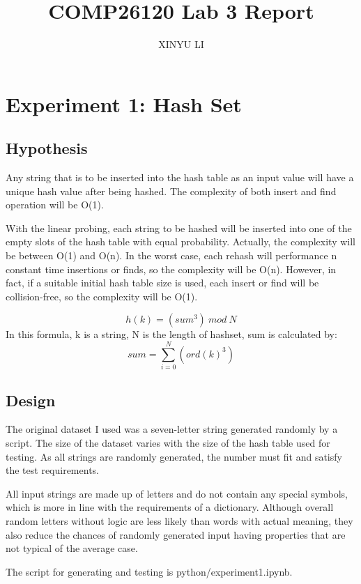 \documentclass[a4]{article}
\title{COMP26120 Lab 3 Report}
\author{XINYU LI}
\begin{document}
\maketitle
\tableofcontents
\newpage

\section{Experiment 1: Hash Set}

\subsection{Hypothesis}
Any string that is to be inserted into the hash table as an input value will have a unique hash value after being hashed. The complexity of both insert and find operation will be O(1).

With the linear probing, each string to be hashed will be inserted into one of the empty slots of the hash table with equal probability. Actually, the complexity will be between O(1) and O(n). In the worst case, each rehash will performance n constant time insertions or finds, so the complexity will be O(n). However, in fact, if a suitable initial hash table size is used, each insert or find will be collision-free, so the complexity will be O(1).

$$ h(k) = (sum^3) \ mod \ N $$
In this formula, k is a string, N is the length of hashset, sum is calculated by:
$$ sum = \sum^{N}_{i=0}(ord(k)^3) $$


\subsection{Design}
The original dataset I used was a seven-letter string generated randomly by a script. The size of the dataset varies with the size of the hash table used for testing. As all strings are randomly generated, the number must fit and satisfy the test requirements.

All input strings are made up of letters and do not contain any special symbols, which is more in line with the requirements of a dictionary. Although overall random letters without logic are less likely than words with actual meaning, they also reduce the chances of randomly generated input having properties that are not typical of the average case.

The script for generating and testing is python/experiment1.ipynb.
\end{document}
